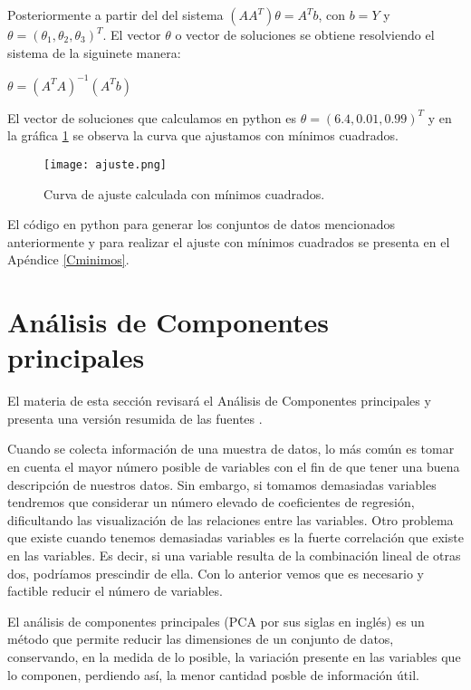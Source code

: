 Posteriormente a partir del del sistema $(AA^{T})\theta = A^{T}b$, con $b = Y$ y $\theta = (\theta_{1}, \theta_{2}, \theta_{3})^{T}$. El vector $\theta$ o vector de soluciones se obtiene resolviendo el sistema de la siguinete manera: 

\begin{center}
$\theta = (A^{T}A)^{-1}(A^{T}b)$
\end{center}

El vector de soluciones que calculamos en python es $\theta = (6.4, 0.01 ,0.99)^{T} $ y en la gráfica \ref{ajuste} se observa la curva que ajustamos con mínimos cuadrados.

\begin{figure}

\centering
\texttt{[image: ajuste.png]}
\caption{Curva de ajuste calculada con mínimos cuadrados.}\label{ajuste}

\end{figure}
	

El código en python para generar los conjuntos de datos mencionados anteriormente y para realizar el ajuste con mínimos cuadrados se presenta en el Apéndice \ref{Cminimos}.
  
\section{Análisis de Componentes principales}

El materia de esta sección revisará el Análisis de Componentes principales y presenta una versión resumida de las fuentes .

Cuando se colecta información de una muestra de datos, lo más común es tomar en cuenta el mayor número posible de variables con el fin de que tener una buena descripción de nuestros datos. Sin embargo, si tomamos demasiadas variables tendremos que considerar un número elevado de coeficientes de regresión, dificultando las visualización de las relaciones entre las variables. Otro problema que existe cuando tenemos demasiadas variables es la fuerte correlación que existe en las variables. Es decir, si una variable resulta de la combinación lineal de otras dos, podríamos prescindir de ella. Con lo anterior vemos que es necesario y factible reducir el número de variables. 

El análisis de componentes principales (PCA por sus siglas en inglés) es un método que permite reducir las dimensiones de un conjunto de datos, conservando, en la medida de lo posible, la variación presente en las variables que lo componen, perdiendo así, la menor cantidad posble de información útil. 

